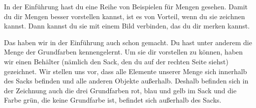 \documentclass[../../main.tex]{subfiles}
\begin{document}
In der Einführung hast du eine Reihe von Beispielen für Mengen gesehen. Damit du dir Mengen besser vorstellen kannst, ist es von Vorteil, wenn du sie zeichnen kannst. Dann kannst du sie mit einem Bild verbinden, das du dir merken kannst. 


Das haben wir in der Einführung auch schon gemacht. Du hast unter anderem die Menge der Grundfarben kennengelernt. Um sie dir vorstellen zu können, haben wir einen Behälter (nämlich den Sack, den du auf der rechten Seite siehst) gezeichnet. Wir stellen uns vor, dass alle Elemente unserer Menge sich innerhalb des Sacks befinden und alle anderen Objekte außerhalb. Deshalb befinden sich in der Zeichnung auch die drei Grundfarben rot, blau und gelb im Sack und die Farbe grün, die keine Grundfarbe ist, befindet sich außerhalb des Sacks.
\end{document}

